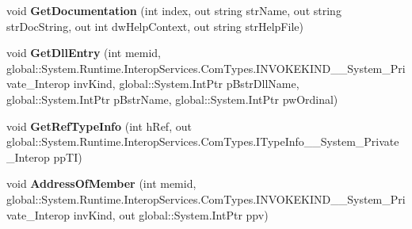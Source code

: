 \begin{DoxyCompactItemize}
\item 
\mbox{\label{interface_system_1_1_runtime_1_1_interop_services_1_1_com_types_1_1_i_type_info_____system___private___interop_a3c7cc84cf38e70c6a8f2599ea99597fb}} 
void {\bfseries Get\+Documentation} (int index, out string str\+Name, out string str\+Doc\+String, out int dw\+Help\+Context, out string str\+Help\+File)
\item 
\mbox{\label{interface_system_1_1_runtime_1_1_interop_services_1_1_com_types_1_1_i_type_info_____system___private___interop_a943dffd3908114326ac1e08d036b2aa7}} 
void {\bfseries Get\+Dll\+Entry} (int memid, global\+::\+System.\+Runtime.\+Interop\+Services.\+Com\+Types.\+I\+N\+V\+O\+K\+E\+K\+I\+N\+D\+\_\+\+\_\+\+System\+\_\+\+Private\+\_\+\+Interop inv\+Kind, global\+::\+System.\+Int\+Ptr p\+Bstr\+Dll\+Name, global\+::\+System.\+Int\+Ptr p\+Bstr\+Name, global\+::\+System.\+Int\+Ptr pw\+Ordinal)
\item 
\mbox{\label{interface_system_1_1_runtime_1_1_interop_services_1_1_com_types_1_1_i_type_info_____system___private___interop_af4dec31689d92f94d3290424d918deaf}} 
void {\bfseries Get\+Ref\+Type\+Info} (int h\+Ref, out global\+::\+System.\+Runtime.\+Interop\+Services.\+Com\+Types.\+I\+Type\+Info\+\_\+\+\_\+\+System\+\_\+\+Private\+\_\+\+Interop pp\+TI)
\item 
\mbox{\label{interface_system_1_1_runtime_1_1_interop_services_1_1_com_types_1_1_i_type_info_____system___private___interop_ac1887de5b20a5e26671bbe3eea33a1e0}} 
void {\bfseries Address\+Of\+Member} (int memid, global\+::\+System.\+Runtime.\+Interop\+Services.\+Com\+Types.\+I\+N\+V\+O\+K\+E\+K\+I\+N\+D\+\_\+\+\_\+\+System\+\_\+\+Private\+\_\+\+Interop inv\+Kind, out global\+::\+System.\+Int\+Ptr ppv)
\item 
\mbox{\label{interface_system_1_1_runtime_1_1_interop_services_1_1_com_types_1_1_i_type_info_____system___private___interop_a3761e8c27250fe83496741af259e32b2}} 

\end{DoxyCompactItemize}
